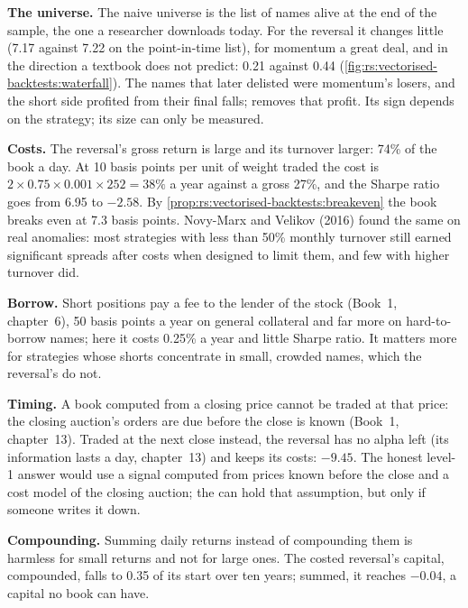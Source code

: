 \textbf{The universe.} The naive universe is the list of names alive at the end of the sample, the one a researcher downloads today. For the
reversal it changes little (7.17 against 7.22 on the point-in-time list), for momentum a great deal, and in the direction a textbook does not
predict: 0.21 against 0.44 (\cref{fig:rs:vectorised-backtests:waterfall}). The names that later delisted were momentum's losers, and the
short side profited from their final falls;  removes that profit. Its sign depends on the strategy; its size can only be measured.

\textbf{Costs.} The reversal's gross return is large and its turnover larger: 74\% of the book a day. At 10 basis points per unit of weight traded
the cost is $2 \times 0.75 \times 0.001 \times 252 = 38\%$ a year against a gross 27\%, and the Sharpe ratio goes from 6.95 to $-2.58$. By
\cref{prop:rs:vectorised-backtests:breakeven} the book breaks even at 7.3 basis points. Novy-Marx and Velikov (2016) found the same on real
anomalies: most strategies with less than 50\% monthly turnover still earned significant spreads after costs when designed to limit them, and few
with higher turnover did.

\textbf{Borrow.} Short positions pay a fee to the lender of the stock (Book~1, chapter~6), 50 basis points a year on general collateral and far more
on hard-to-borrow names; here it costs 0.25\% a year and little Sharpe ratio. It matters more for strategies whose shorts concentrate in small,
crowded names, which the reversal's do not.

\textbf{Timing.} A book computed from a closing price cannot be traded at that price: the closing auction's orders are due before the close is known
(Book~1, chapter~13). Traded at the next close instead, the reversal has no alpha left (its information lasts a day, chapter~13) and keeps its
costs: $-9.45$. The honest level-1 answer would use a signal computed from prices known before the close and a cost model of the closing auction;
the  can hold that assumption, but only if someone writes it down.

\textbf{Compounding.} Summing daily returns instead of compounding them is harmless for small returns and not for large ones. The costed reversal's
capital, compounded, falls to 0.35 of its start over ten years; summed, it reaches $-0.04$, a capital no book can have.

